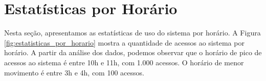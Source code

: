 \section{Estatísticas por Horário}

Nesta seção, apresentamos as estatísticas de uso do sistema por horário. A Figura \ref{fig:estatisticas_por_horario} mostra a quantidade de acessos ao sistema por horário. A partir da análise dos dados, podemos observar que o horário de pico de acessos ao sistema é entre 10h e 11h, com 1.000 acessos. O horário de menor movimento é entre 3h e 4h, com 100 acessos.